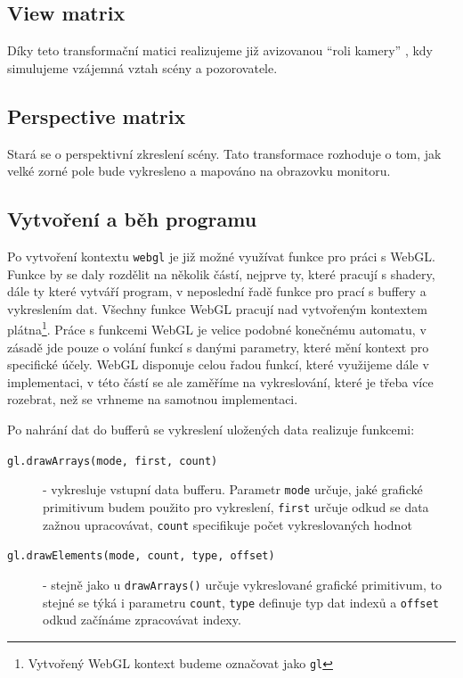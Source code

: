 \subsection{View matrix}
Díky teto transformační matici realizujeme již avizovanou ``roli kamery'' , kdy simulujeme vzájemná vztah scény a pozorovatele.

\subsection{Perspective matrix}
Stará se o perspektivní zkreslení scény. Tato transformace rozhoduje o tom, jak velké zorné pole bude vykresleno a mapováno 
na obrazovku monitoru. 

\newpage

\subsection{Vytvoření a běh programu}
Po vytvoření kontextu \texttt{webgl} je již možné využívat funkce pro práci s WebGL. Funkce by se daly rozdělit na několik částí, nejprve ty, které pracují s shadery, dále ty které vytváří program, v neposlední řadě funkce pro prací s buffery a vykreslením dat. Všechny funkce WebGL pracují nad vytvořeným kontextem plátna\footnote{Vytvořený WebGL kontext budeme označovat jako \texttt{gl}}. Práce s funkcemi WebGL je velice podobné konečnému automatu, v zásadě jde pouze o volání funkcí s danými parametry, které mění kontext pro specifické účely. WebGL disponuje celou řadou funkcí, které využijeme dále v implementaci, v této částí se ale zaměříme na vykreslování, které je třeba více rozebrat, než se vrhneme na samotnou implementaci.
 

 
Po nahrání dat do bufferů se vykreslení uložených data realizuje funkcemi:


\begin{description}
	\item[\texttt{gl.drawArrays(mode, first, count)}] - vykresluje vstupní data bufferu. Parametr \texttt{mode} určuje, jaké grafické primitivum budem použito pro vykreslení, \texttt{first} určuje odkud se data zažnou upracovávat, \texttt{count} specifikuje počet vykreslovaných hodnot
	
	\item[\texttt{gl.drawElements(mode, count, type, offset)}] - stejně jako u \texttt{drawArrays()} určuje vykreslované grafické primitivum, to stejné se týká i parametru \texttt{count}, \texttt{type} definuje typ dat indexů a \texttt{offset} odkud začínáme zpracovávat indexy. 
\end{description}

